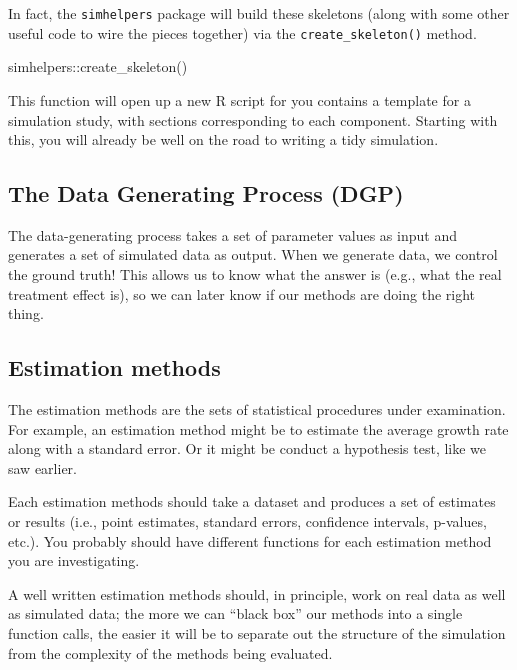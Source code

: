 \documentclass[
]{book}
\newenvironment{Shaded}{\begin{snugshade}}{\end{snugshade}}
\newcommand{\FunctionTok}[1]{\textcolor[rgb]{0.00,0.00,0.00}{#1}}
\newcommand{\NormalTok}[1]{#1}
\newcommand{\SpecialCharTok}[1]{\textcolor[rgb]{0.00,0.00,0.00}{#1}}
\begin{document}
In fact, the \texttt{simhelpers} package will build these skeletons (along with some other useful code to wire the pieces together) via the \texttt{create\_skeleton()} method.

\begin{Shaded}
\begin{Highlighting}[]
\NormalTok{simhelpers}\SpecialCharTok{::}\FunctionTok{create\_skeleton}\NormalTok{()}
\end{Highlighting}
\end{Shaded}

This function will open up a new R script for you contains a template for a simulation study, with sections corresponding to each component.
Starting with this, you will already be well on the road to writing a tidy simulation.

\hypertarget{the-data-generating-process-dgp}{%
\subsection{The Data Generating Process (DGP)}\label{the-data-generating-process-dgp}}

The data-generating process takes a set of parameter values as input and generates a set of simulated data as output.
When we generate data, we control the ground truth!
This allows us to know what the answer is (e.g., what the real treatment effect is), so we can later know if our methods are doing the right thing.

\hypertarget{estimation-methods}{%
\subsection{Estimation methods}\label{estimation-methods}}

The estimation methods are the sets of statistical procedures under examination.
For example, an estimation method might be to estimate the average growth rate along with a standard error.
Or it might be conduct a hypothesis test, like we saw earlier.

Each estimation methods should take a dataset and produces a set of estimates or results (i.e., point estimates, standard errors, confidence intervals, p-values, etc.).
You probably should have different functions for each estimation method you are investigating.

A well written estimation methods should, in principle, work on real data as well as simulated data; the more we can ``black box'' our methods into a single function calls, the easier it will be to separate out the structure of the simulation from the complexity of the methods being evaluated.
\end{document}
